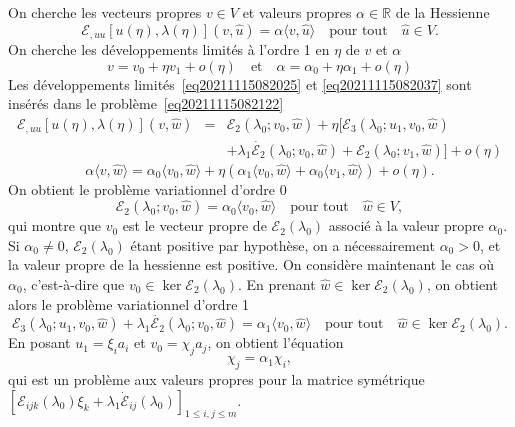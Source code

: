 \documentclass[12pt, final]{amsart}
\begin{document}
On cherche les vecteurs propres $v \in V$ et valeurs propres $\alpha \in
\mathbb{R}$ de la Hessienne
\begin{equation}
  \label{eq20211115082122} \mathcal{E}_{, u  u} [u (\eta), \lambda
  (\eta)] (v, \hat{u}) = \alpha \langle v, \hat{u} \rangle \quad \text{pour
  tout} \quad \hat{u} \in V.
\end{equation}
On cherche les développements limités à l'ordre 1 en $\eta$ de $v$
et $\alpha$
\begin{equation}
  \label{eq20211115082037} v = v_0 + \eta v_1 + o (\eta) \quad \text{et} \quad
  \alpha = \alpha_0 + \eta \alpha_1 + o (\eta)
\end{equation}
Les développements limités~\eqref{eq20211115082025} et
\eqref{eq20211115082037} sont insérés dans le
problème~\eqref{eq20211115082122}
\begin{eqnarray}
  \mathcal{E}_{, u  u} [u (\eta), \lambda (\eta)] (v, \hat{w}) & = &
  \mathcal{E}_2  (\lambda_0 ; v_0, \hat{w}) + \eta [\mathcal{E}_3  (\lambda_0
  ; u_1, v_0, \hat{w})  \nonumber\\
  &  &  + \lambda_1  \dot{\mathcal{E}_2} (\lambda_0 ; v_0, \hat{w})
   +\mathcal{E}_2  (\lambda_0 ; v_1, \hat{w})] + o (\eta)
\end{eqnarray}
\begin{equation}
  \alpha \langle v, \hat{w} \rangle = \alpha_0  \langle v_0, \hat{w} \rangle +
  \eta (\alpha_1 \langle v_0, \hat{w} \rangle + \alpha_0 \langle v_1, \hat{w}
  \rangle) + o (\eta) .
\end{equation}
On obtient le problème variationnel d'ordre 0
\begin{equation}
  \mathcal{E}_2 (\lambda_0 ; v_0, \hat{w}) = \alpha_0  \langle v_0, \hat{w}
  \rangle \quad \text{pour tout} \quad \hat{w} \in V,
\end{equation}
qui montre que $v_0$ est le vecteur propre de $\mathcal{E}_2  (\lambda_0)$
associé à la valeur propre $\alpha_0$. Si $\alpha_0 \neq 0$,
$\mathcal{E}_2  (\lambda_0)$ étant positive par hypothèse, on a
nécessairement $\alpha_0 > 0$, et la valeur propre de la hessienne est
positive. On considère maintenant le cas où $\alpha_0$,
c'est-à-dire que $v_0 \in \ker \mathcal{E}_2  (\lambda_0)$. En prenant
$\hat{w} \in \ker \mathcal{E}_2 (\lambda_0)$, on obtient alors le problème
variationnel d'ordre 1
\begin{equation}
  \mathcal{E}_3 (\lambda_0 ; u_1, v_0, \hat{w}) + \lambda_1
  \dot{\mathcal{E}_2} (\lambda_0 ; v_0, \hat{w}) = \alpha_1  \langle v_0,
  \hat{w} \rangle \quad \text{pour tout} \quad \hat{w} \in \ker \mathcal{E}_2
  (\lambda_0) .
\end{equation}
En posant $u_1 = \xi_i a_i$ et $v_0 = \chi_j a_j$, on obtient l'équation
\begin{equation}
  [\mathcal{E}_{i  j  k}  (\lambda_0) \xi_k + \lambda_1
  \dot{\mathcal{E}}_{i  j} (\lambda_0)] \chi_j = \alpha_1 \chi_i,
\end{equation}
qui est un problème aux valeurs propres pour la matrice symétrique
$[\mathcal{E}_{i  j  k}  (\lambda_0) \xi_k + \lambda_1
\dot{\mathcal{E}}_{i  j} (\lambda_0)]_{1 \leq i, j \leq m}$.

\end{document}
